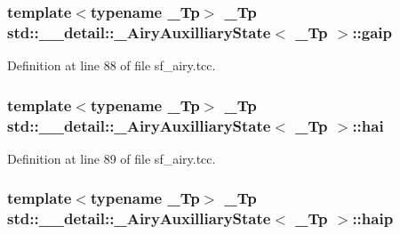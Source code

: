 \subsubsection[{\texorpdfstring{gaip}{gaip}}]{\setlength{\rightskip}{0pt plus 5cm}template$<$typename \+\_\+\+Tp$>$ \+\_\+\+Tp {\bf std\+::\+\_\+\+\_\+detail\+::\+\_\+\+Airy\+Auxilliary\+State}$<$ \+\_\+\+Tp $>$\+::gaip}\hypertarget{structstd_1_1____detail_1_1__AiryAuxilliaryState_a6bf0ccf2ea90395d1a035ac068a8e3d4}{}\label{structstd_1_1____detail_1_1__AiryAuxilliaryState_a6bf0ccf2ea90395d1a035ac068a8e3d4}


Definition at line 88 of file sf\+\_\+airy.\+tcc.

\subsubsection[{\texorpdfstring{hai}{hai}}]{\setlength{\rightskip}{0pt plus 5cm}template$<$typename \+\_\+\+Tp$>$ \+\_\+\+Tp {\bf std\+::\+\_\+\+\_\+detail\+::\+\_\+\+Airy\+Auxilliary\+State}$<$ \+\_\+\+Tp $>$\+::hai}\hypertarget{structstd_1_1____detail_1_1__AiryAuxilliaryState_a1fa9992d7c882e8b63f30cd4116e2d38}{}\label{structstd_1_1____detail_1_1__AiryAuxilliaryState_a1fa9992d7c882e8b63f30cd4116e2d38}


Definition at line 89 of file sf\+\_\+airy.\+tcc.

\subsubsection[{\texorpdfstring{haip}{haip}}]{\setlength{\rightskip}{0pt plus 5cm}template$<$typename \+\_\+\+Tp$>$ \+\_\+\+Tp {\bf std\+::\+\_\+\+\_\+detail\+::\+\_\+\+Airy\+Auxilliary\+State}$<$ \+\_\+\+Tp $>$\+::haip}\hypertarget{structstd_1_1____detail_1_1__AiryAuxilliaryState_a27725093c7098e34c6d540ba3f629c56}{}\label{structstd_1_1____detail_1_1__AiryAuxilliaryState_a27725093c7098e34c6d540ba3f629c56}


